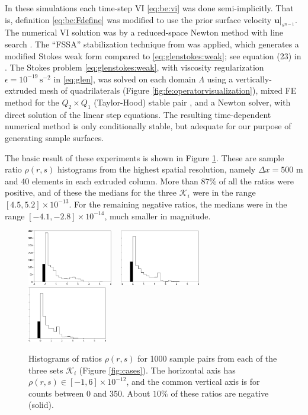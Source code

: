 \documentclass[hidelinks,onefignum,onetabnum,final]{siamart220329}  %
\newcommand{\eps}{\epsilon}
\newcommand{\bu}{\mathbf{u}}
\newcommand{\cK}{\mathcal{K}}
\begin{document}
In these simulations each time-step VI \eqref{eq:be:vi} was done semi-implicitly.  That is, definition \eqref{eq:be:Fdefine} was modified to use the prior surface velocity $\bu|_{s^{n-1}}$.  The numerical VI solution was by a reduced-space Newton method with line search \cite{BensonMunson2006}.  The ``FSSA'' stabilization technique from \cite{LofgrenAhlkronaHelanow2022} was applied, which generates a modified Stokes weak form compared to \eqref{eq:glenstokes:weak}; see equation (23) in \cite{LofgrenAhlkronaHelanow2022}.  The Stokes problem \eqref{eq:glenstokes:weak}, with viscosity regularization $\eps=10^{-19}\, \text{s}^{-2}$ in \eqref{eq:glen}, was solved on each domain $\Lambda$ using a vertically-extruded mesh of quadrilaterals (Figure \ref{fig:fe:operatorvisualization}), mixed FE method for the $Q_2\times Q_1$ (Taylor-Hood) stable pair \cite{Elmanetal2014}, and a Newton solver, with direct solution of the linear step equations.  The resulting time-dependent numerical method is only conditionally stable, but adequate for our purpose of generating sample surfaces.

The basic result of these experiments is shown in Figure \ref{fig:ratios}.  These are sample ratio $\rho(r,s)$ histograms from the highest spatial resolution, namely $\Delta x=500$ m and 40 elements in each extruded column.  More than $87\%$ of all the ratios were positive, and of these the medians for the three $\cK_i$ were in the range $[4.5,5.2] \times 10^{-13}$.  For the remaining negative ratios, the medians were in the range $[-4.1,-2.8]\times 10^{-14}$, much smaller in magnitude.

\begin{figure}[ht]
\mbox{\includegraphics[width=0.33\textwidth]{figs/flatratios.png} \, \includegraphics[width=0.31\textwidth]{figs/smoothratios.png} \, \includegraphics[width=0.31\textwidth]{figs/roughratios.png}}

\caption{Histograms of ratios $\rho(r,s)$ for 1000 sample pairs from each of the three sets $\cK_i$ (Figure \ref{fig:cases}).  The horizontal axis has  $\rho(r,s) \in [-1,6]\times 10^{-12}$, and the common vertical axis is for counts between 0 and 350.  About $10\%$ of these ratios are negative (solid).}
\label{fig:ratios}
\end{figure}
\end{document}
